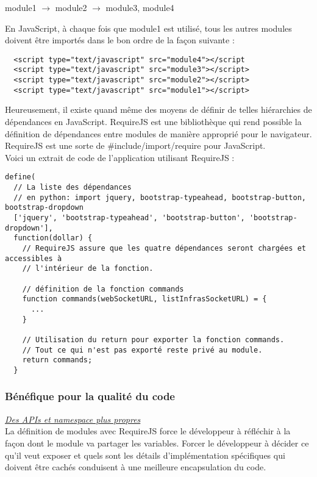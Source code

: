 module1 $\rightarrow$ module2 $\rightarrow$ module3, module4 

En JavaScript, à chaque fois que module1 est utilisé, tous les autres modules
doivent être importés dans le bon ordre de la façon suivante :

\lstset{language=XML}
\begin{lstlisting}
  <script type="text/javascript" src="module4"></script
  <script type="text/javascript" src="module3"></script>
  <script type="text/javascript" src="module2"></script>
  <script type="text/javascript" src="module1"></script>
\end{lstlisting}

Heureusement, il existe quand même des moyens de définir de telles hiérarchies de
dépendances en JavaScript. RequireJS est une bibliothèque qui rend possible la
définition de dépendances entre modules de manière approprié pour le navigateur.
RequireJS est une sorte de \#include/import/require pour JavaScript.\\
Voici un extrait de code de l'application utilisant RequireJS :
\lstset{language=JavaScript}
\begin{lstlisting}[caption=Définition du module commands avec RequireJS]
  define(
  // La liste des dépendances 
  // en python: import jquery, bootstrap-typeahead, bootstrap-button, bootstrap-dropdown
  ['jquery', 'bootstrap-typeahead', 'bootstrap-button', 'bootstrap-dropdown'], 
  function(dollar) { 
    // RequireJS assure que les quatre dépendances seront chargées et accessibles à
    // l'intérieur de la fonction.
    
    // définition de la fonction commands
    function commands(webSocketURL, listInfrasSocketURL) = {
      ...
    }
    
    // Utilisation du return pour exporter la fonction commands.
    // Tout ce qui n'est pas exporté reste privé au module.
    return commands;
  }
\end{lstlisting}


\subsubsection{Bénéfique pour la qualité du code}

\textit{\underline{Des APIs et namespace plus propres}}\\

La définition de modules avec RequireJS force le développeur à réfléchir à la
façon dont le module va partager les variables. Forcer le développeur à décider
ce qu'il veut exposer et quels sont les détails d'implémentation spécifiques
qui doivent être cachés conduisent à une meilleure encapsulation du code.

